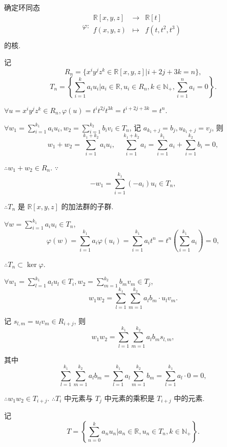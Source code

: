 \documentclass[color=black,device=normal,lang=cn,mode=geye]{elegantnote}
\begin{document}
\begin{exercisec}[5.3.11]
    确定环同态
    \[\varphi:\begin{array}{rcl}
        \mathbb{R}[x,y,z] & \to & \mathbb{R}[t] \\
        f(x,y,z) & \mapsto & f(t,t^2,t^3) \\
    \end{array}\]
    的核.
\end{exercisec}
\begin{solution}
    记
    \[R_n=\{x^iy^jz^k\in\mathbb{R}[x,y,z]|i+2j+3k=n\},\]
    \[T_n=\left\{\sum\limits_{i=1}^ka_iu_i\Bigg|a_i\in\mathbb{R},u_i\in R_n,k\in\mathbb{N}_+,\sum\limits_{i=1}^na_i=0\right\}.\]

    $\forall u=x^iy^jz^k\in R_n,\varphi(u)=t^it^{2j}t^{3k}=t^{i+2j+3k}=t^n$.

    $\forall w_1=\sum\limits_{i=1}^{k_1}a_iu_i,w_2=\sum\limits_{i=1}^{k_2}b_iv_i\in T_n$, 记 $a_{k_1+j}=b_j,u_{k_1+j}=v_j$, 则
    \[w_1+w_2=\sum\limits_{i=1}^{k_1+k_2}a_iu_i,\quad\sum\limits_{i=1}^{k_1+k_2}a_i=\sum\limits_{i=1}^{k_1}a_i+\sum\limits_{i=1}^{k_2}b_i=0,\]

    $\therefore w_1+w_2\in R_n$. $\because$
    \[-w_1=\sum\limits_{i=1}^{k_1}(-a_i)u_i\in T_n,\]

    $\therefore T_n$ 是 $\mathbb{R}[x,y,z]$ 的加法群的子群.

    $\forall w=\sum\limits_{i=1}^{k_1}a_iu_i\in T_n$,
    \[\varphi(w)=\sum\limits_{i=1}^{k_1}a_i\varphi(u_i)=\sum\limits_{i=1}^{k_1}a_it^n=t^n\left(\sum\limits_{i=1}^{k_1}a_i\right)=0,\]

    $\therefore T_n\subset\ker\varphi$.

    $\forall w_1=\sum\limits_{l=1}^{k_1}a_lu_l\in T_i,w_2=\sum\limits_{m=1}^{k_2}b_mv_m\in T_j$,
    \[w_1w_2=\sum\limits_{l=1}^{k_1}\sum\limits_{m=1}^{k_2}a_lb_m\cdot u_lv_m.\]

    记 $s_{l,m}=u_lv_m\in R_{i+j}$, 则
    \[w_1w_2=\sum\limits_{l=1}^{k_1}\sum\limits_{m=1}^{k_2}a_lb_ms_{l,m},\]

    其中
    \[\sum\limits_{l=1}^{k_1}\sum\limits_{m=1}^{k_2}a_lb_m=\sum\limits_{l=1}^{k_1}a_l\sum\limits_{m=1}^{k_2}b_m=\sum\limits_{l=1}^{k_1}a_l\cdot0=0,\]
    
    $\therefore w_1w_2\in T_{i+j}$. $\therefore T_i$ 中元素与 $T_j$ 中元素的乘积是 $T_{i+j}$ 中的元素.
    
    记
    \[T=\left\{\sum\limits_{n=0}^ka_nu_n\Bigg|a_n\in\mathbb{R},u_n\in T_n,k\in\mathbb{N}_+\right\}.\]


\end{solution}
\end{document}
